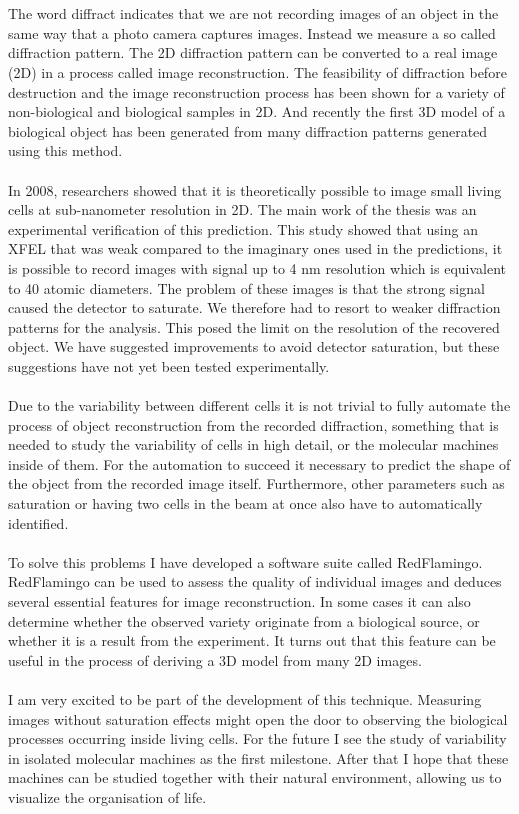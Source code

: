 \\\\
The word diffract indicates that we are not recording images of an object in the same way that a photo camera captures images. Instead we measure a so called diffraction pattern. The 2D diffraction pattern can be converted to a real image (2D) in a process called image reconstruction. The feasibility of diffraction before destruction and the image reconstruction process has been shown for a variety of non-biological and biological samples in 2D.  And recently the first 3D model of a biological object has been generated from many diffraction patterns generated using this method.
\\\\
In 2008, researchers showed that it is theoretically possible to image small living cells at sub-nanometer resolution in 2D. The main work of the thesis was an experimental verification of this prediction. This study showed that using an XFEL that was weak compared to the imaginary ones used in the predictions, it is possible to record images with signal up to 4 nm resolution which is equivalent to 40 atomic diameters. The problem of these images is that the strong signal caused the detector to saturate. We therefore had to resort to weaker diffraction patterns for the analysis. This posed the limit on the resolution of the recovered object. We have suggested improvements to avoid detector saturation, but these suggestions have not yet been tested experimentally.
\\\\
Due to the variability between different cells it is not trivial to fully automate the process of object reconstruction from the recorded diffraction, something that is needed to study the variability of cells in high detail, or the molecular machines inside of them. For the automation to succeed it necessary to predict the shape of the object from the recorded image itself. Furthermore, other parameters such as saturation or having two cells in the beam at once also have to automatically identified.
\\\\
To solve this problems I have developed a software suite called RedFlamingo. RedFlamingo can be used to assess the quality of individual images and deduces several essential features for image reconstruction. In some cases it can also determine whether the observed variety originate from a biological source, or whether it is a result from the experiment. It turns out that this feature can be useful in the process of deriving a 3D model from many 2D images. 
\\\\
I am very excited to be part of the development of this technique. Measuring images without saturation effects might open the door to observing the biological processes occurring inside living cells. For the future I see the study of variability in isolated molecular machines as the first milestone. After that I hope that these machines can be studied together with their natural environment, allowing us to visualize the organisation of life.
